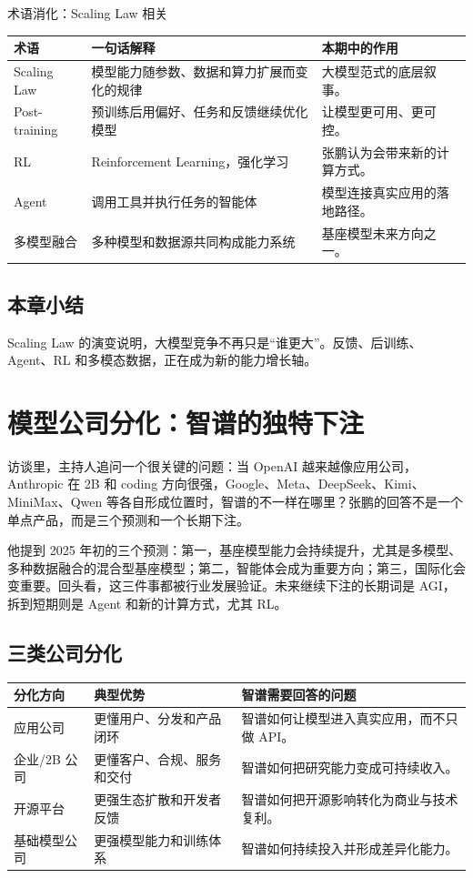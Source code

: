 \documentclass[a4paper]{article}
\begin{document}
\begin{knowledgebox}{术语消化：Scaling Law 相关}
\begin{tabularx}{\textwidth}{p{}p{}X}
\toprule
术语 & 一句话解释 & 本期中的作用 \\
\midrule
Scaling Law & 模型能力随参数、数据和算力扩展而变化的规律 & 大模型范式的底层叙事。 \\
Post-training & 预训练后用偏好、任务和反馈继续优化模型 & 让模型更可用、更可控。 \\
RL & Reinforcement Learning，强化学习 & 张鹏认为会带来新的计算方式。 \\
Agent & 调用工具并执行任务的智能体 & 模型连接真实应用的落地路径。 \\
多模型融合 & 多种模型和数据源共同构成能力系统 & 基座模型未来方向之一。 \\
\bottomrule
\end{tabularx}
\end{knowledgebox}

\subsection{本章小结}

Scaling Law 的演变说明，大模型竞争不再只是“谁更大”。反馈、后训练、Agent、RL 和多模态数据，正在成为新的能力增长轴。

\section{模型公司分化：智谱的独特下注}

访谈里，主持人追问一个很关键的问题：当 OpenAI 越来越像应用公司，Anthropic 在 2B 和 coding 方向很强，Google、Meta、DeepSeek、Kimi、MiniMax、Qwen 等各自形成位置时，智谱的不一样在哪里？张鹏的回答不是一个单点产品，而是三个预测和一个长期下注。

他提到 2025 年初的三个预测：第一，基座模型能力会持续提升，尤其是多模型、多种数据融合的混合型基座模型；第二，智能体会成为重要方向；第三，国际化会变重要。回头看，这三件事都被行业发展验证。未来继续下注的长期词是 AGI，拆到短期则是 Agent 和新的计算方式，尤其 RL。

\subsection{三类公司分化}

\begin{longtable}{p{}p{}p{}}
\toprule
分化方向 & 典型优势 & 智谱需要回答的问题 \\
\midrule
应用公司 & 更懂用户、分发和产品闭环 & 智谱如何让模型进入真实应用，而不只做 API。 \\
企业/2B 公司 & 更懂客户、合规、服务和交付 & 智谱如何把研究能力变成可持续收入。 \\
开源平台 & 更强生态扩散和开发者反馈 & 智谱如何把开源影响转化为商业与技术复利。 \\
基础模型公司 & 更强模型能力和训练体系 & 智谱如何持续投入并形成差异化能力。 \\
\bottomrule
\end{longtable}
\end{document}
